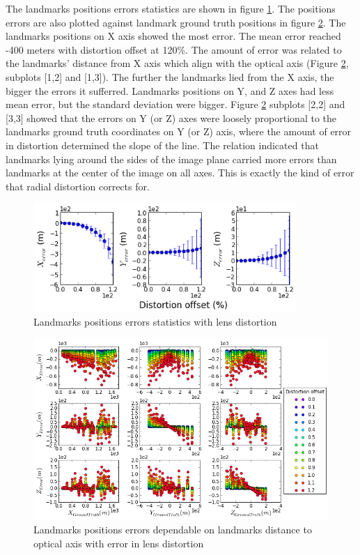 The landmarks positions errors statistics are shown in figure
\ref{fig:simfig45}. The positions errors are also plotted against
landmark ground truth positions in figure \ref{fig:simfig46}. The
landmarks positions on X axis showed the most error. The mean error
reached -400 meters with distortion offset at 120\%. The amount of
error was related to the landmarks' distance from X axis which align
with the optical axis (Figure \ref{fig:simfig46}, subplots [1,2] and
[1,3]). The further the landmarks lied from the X axis, the bigger the
errors it sufferred. Landmarks positions on Y, and Z axes had less
mean error, but the standard deviation were bigger. Figure
\ref{fig:simfig46} subplots [2,2] and [3,3] showed that the errors on
Y (or Z) axes were loosely proportional to the landmarks ground truth
coordinates on Y (or Z) axis, where the amount of error in distortion
determined the slope of the line. The relation indicated that
landmarks lying around the sides of the image plane carried more
errors than landmarks at the center of the image on all axes. This is
exactly the kind of error that radial distortion corrects for.

\begin{figure}[h]%
  \centering
  \includegraphics[width=10cm,keepaspectratio=true]{./Figures/SimulationFigures/Figure45.png}
  \caption{Landmarks positions errors statistics with lens distortion}
  \label{fig:simfig45}
\end{figure}

\begin{figure}[h] %
  \centering
  \includegraphics[width=13cm,keepaspectratio=true]{./Figures/SimulationFigures/Figure46.png}
  \caption{Landmarks positions errors dependable on landmarks distance
    to optical axis with error in lens distortion}
  \label{fig:simfig46}
\end{figure}
\FloatBarrier

